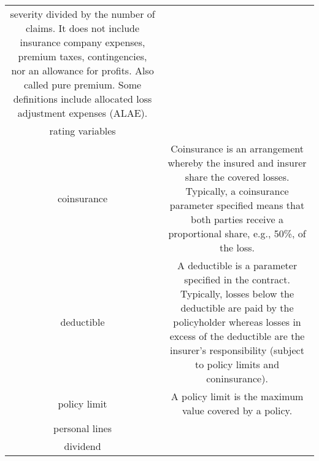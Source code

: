 \documentclass[
]{book}
\begin{document}
\begin{longtable}[]{@{}cc@{}}
\begin{minipage}[t]{0.43\columnwidth}
severity divided by the number
of claims. It does not include
insurance company expenses,
premium taxes, contingencies,
nor an allowance for profits.
Also called pure premium. Some
definitions include allocated
loss adjustment expenses
(ALAE).\strut
\end{minipage}\tabularnewline
\begin{minipage}[t]{0.39\columnwidth}\centering
rating variables\strut
\end{minipage} & \begin{minipage}[t]{0.43\columnwidth}\centering
\strut
\end{minipage}\tabularnewline
\begin{minipage}[t]{0.39\columnwidth}\centering
coinsurance\strut
\end{minipage} & \begin{minipage}[t]{0.43\columnwidth}\centering
Coinsurance is an arrangement
whereby the insured and
insurer share the covered
losses. Typically, a
coinsurance parameter
specified means that both
parties receive a proportional
share, e.g., 50\%, of the loss.\strut
\end{minipage}\tabularnewline
\begin{minipage}[t]{0.39\columnwidth}\centering
deductible\strut
\end{minipage} & \begin{minipage}[t]{0.43\columnwidth}\centering
A deductible is a parameter
specified in the contract.
Typically, losses below the
deductible are paid by the
policyholder whereas losses in
excess of the deductible are
the insurer's responsibility
(subject to policy limits and
coninsurance).\strut
\end{minipage}\tabularnewline
\begin{minipage}[t]{0.39\columnwidth}\centering
policy limit\strut
\end{minipage} & \begin{minipage}[t]{0.43\columnwidth}\centering
A policy limit is the maximum
value covered by a policy.\strut
\end{minipage}\tabularnewline
\begin{minipage}[t]{0.39\columnwidth}\centering
personal lines\strut
\end{minipage} & \begin{minipage}[t]{0.43\columnwidth}\centering
\strut
\end{minipage}\tabularnewline
\begin{minipage}[t]{0.39\columnwidth}\centering
dividend\strut
\end{minipage} & \begin{minipage}[t]{0.43\columnwidth}\centering

\end{minipage}
\end{longtable}
\end{document}
